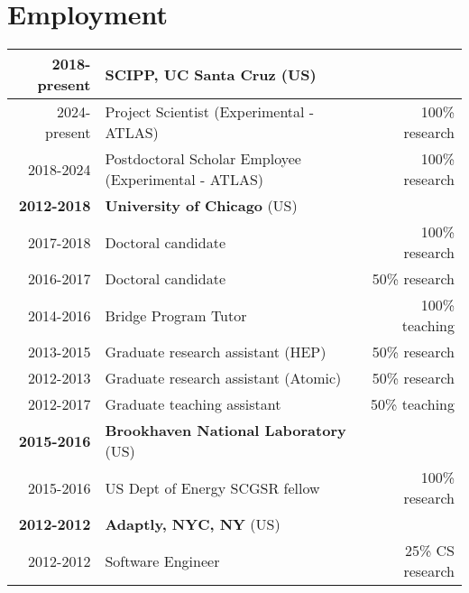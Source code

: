 \vspace{-2.0em}\section{Employment} \label{sec:employment}\vspace{-1em}
\begin{table*}[h!]
	\footnotesize
	\begin{tabular}{r|lr}
		\centering
		\normalsize\textbf{2018-present} & \textbf{SCIPP, UC Santa Cruz} (US)                   &                  \\
		\hline
		2024-present                     & Project Scientist (Experimental - ATLAS)             & 100\% research   \\
		2018-2024                        & Postdoctoral Scholar Employee (Experimental - ATLAS) & 100\% research   \\
		\hline\hline
		\normalsize\textbf{2012-2018}    & \textbf{University of Chicago} (US)                  &                  \\
		\hline
		2017-2018                        & Doctoral candidate                                   & 100\% research   \\
		2016-2017                        & Doctoral candidate                                   & 50\% research    \\
		2014-2016                        & Bridge Program Tutor                                 & 100\% teaching   \\
		2013-2015                        & Graduate research assistant (HEP)                    & 50\% research    \\
		2012-2013                        & Graduate research assistant (Atomic)                 & 50\% research    \\
		2012-2017                        & Graduate teaching assistant                          & 50\% teaching    \\
		\hline\hline
		\normalsize\textbf{2015-2016}    & \textbf{Brookhaven National Laboratory} (US)         &                  \\
		\hline
		2015-2016                        & US Dept of Energy SCGSR fellow                       & 100\% research   \\
		\hline\hline
		\normalsize\textbf{2012-2012}    & \textbf{Adaptly, NYC, NY} (US)                                          \\
		\hline
		2012-2012                        & Software Engineer                                    & 25\% CS research \\

\end{tabular}
\end{table*}

